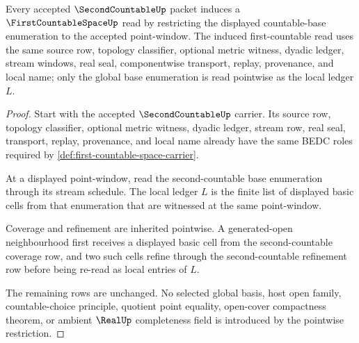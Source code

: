 \begin{theorem}
\label{thm:first-countable-space-second-countable-handoff}
Every accepted $\SecondCountableUp$ packet induces a $\FirstCountableSpaceUp$ read by restricting the displayed countable-base enumeration to the accepted point-window. The induced first-countable read uses the same source row, topology classifier, optional metric witness, dyadic ledger, stream windows, real seal, componentwise transport, replay, provenance, and local name; only the global base enumeration is read pointwise as the local ledger $L$.
\end{theorem}
\begin{proof}
Start with the accepted $\SecondCountableUp$ carrier. Its source row, topology classifier, optional metric witness, dyadic ledger, stream row, real seal, transport, replay, provenance, and local name already have the same BEDC roles required by \autoref{def:first-countable-space-carrier}.

At a displayed point-window, read the second-countable base enumeration through its stream schedule. The local ledger $L$ is the finite list of displayed basic cells from that enumeration that are witnessed at the same point-window.

Coverage and refinement are inherited pointwise. A generated-open neighbourhood first receives a displayed basic cell from the second-countable coverage row, and two such cells refine through the second-countable refinement row before being re-read as local entries of $L$.

The remaining rows are unchanged. No selected global basis, host open family, countable-choice principle, quotient point equality, open-cover compactness theorem, or ambient $\RealUp$ completeness field is introduced by the pointwise restriction.
\end{proof}

